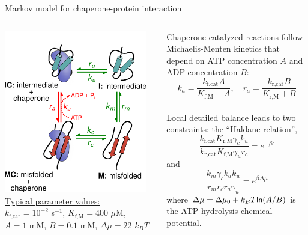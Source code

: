 \documentclass{beamer}
\begin{document}
\begin{frame}{Markov model for chaperone-protein interaction}

  \vspace{0.5em}
  \begin{columns}
    \centering
    \includegraphics[width=0.95\textwidth]{markov3.pdf}\\[0.5em]
    {\small{\color{blue} \underline{Typical parameter values:}\\
$k_\text{f,cat} = 10^{-2}$ s$^{-1}$, $K_\text{f,M} = 400$ $\mu$M,\\ $A = 1$ mM, $B=0.1$ mM, $\Delta \mu = 22$ $k_BT$}}

     {\small Chaperone-catalyzed reactions
      follow Michaelis-Menten kinetics that depend on \alert{ATP concentration $A$} and
      \alert{ADP concentration $B$}:
    \[
k_a = \frac{k_\text{f,cat} A}{K_\text{f,M} + A}, \quad r_a = \frac{k_\text{r,cat} B}{K_\text{r,M} + B}
\] \\

\pause
{\color{green!50!black} Local detailed balance} leads to two constraints: the ``Haldane relation'',
\[
\frac{k_\text{f,cat} K_\text{r,M} \gamma_c k_u}{k_\text{r,cat} K_\text{f,M} \gamma_u r_c} = e^{-\beta \epsilon}
\]
and
\[
\frac{k_m \gamma_c k_a k_u}{r_m r_c r_a \gamma_u} = e^{\beta \Delta \mu}
\]
where $\Delta \mu= \Delta \mu_0 + k_BT {\sf ln} (A/B)$ is the ATP hydrolysis chemical potential.}

    \end{columns}
\end{frame}
\end{document}
